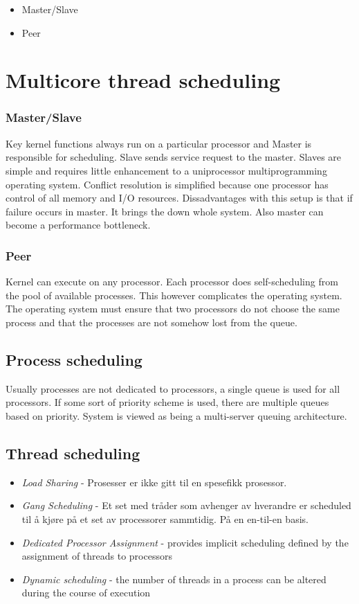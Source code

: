 \begin{itemize}
\item 
Master/Slave
\item 
Peer
\end{itemize}
\section{Multicore thread scheduling}

\subsubsection{Master/Slave}
Key kernel functions always run on a particular processor and Master is responsible for scheduling.  Slave sends service request to the master. Slaves are simple and requires little enhancement to a uniprocessor multiprogramming operating system. Conflict resolution is simplified because one processor has control of all memory and I/O resources. Dissadvantages with this setup is that if failure occurs in master. It brings the down whole system. Also master can become a performance bottleneck.


\subsubsection{Peer}
Kernel can execute on any processor. Each processor does self-scheduling from the pool of available processes. This however complicates the operating system. The operating system must ensure that two processors do not choose the same process and that the processes are not somehow lost from the queue.

\subsection{Process scheduling}
Usually processes are not dedicated to processors, a single queue is used for all processors. If some sort of priority scheme is used, there are multiple queues based
on priority. System is viewed as being a multi-server queuing architecture.

\subsection{Thread scheduling}

\begin{itemize}
\item 
\emph{Load Sharing} - Prosesser er ikke gitt til en spesefikk prosessor.
\item 
\emph{Gang Scheduling} - Et set med tråder som avhenger av hverandre er scheduled til å kjøre på et set av processorer sammtidig. På en en-til-en basis.
\item 
\emph{Dedicated Processor Assignment} - provides implicit scheduling
defined by the assignment of
threads to processors
\item 
\emph{Dynamic scheduling } - the number of threads in a process
can be altered during the course of
execution
\end{itemize}


